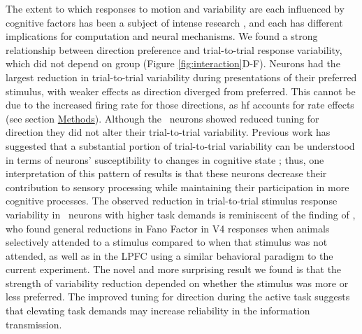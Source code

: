 The extent to which responses to motion and variability are each influenced by cognitive factors has been a subject of intense research \parencite{Renart2014,Gilbert2013}, and each has different implications for computation and neural mechanisms.   
We found a strong relationship between direction preference and trial-to-trial response variability, which did not depend on group (Figure \ref{fig:interaction}D-F). Neurons had the largest reduction in trial-to-trial variability during presentations of their preferred stimulus, with weaker effects as direction diverged from preferred. This cannot be due to the increased firing rate for those directions, as \gls{hf} accounts for rate effects (see section \hyperref[{sec:methods}]{Methods}). Although the \suppressed\ neurons showed reduced tuning for direction they did not alter their trial-to-trial variability. 
Previous work has suggested that a substantial portion of trial-to-trial variability can be understood in terms of neurons' susceptibility to changes in cognitive state \parencite{Ecker2016a,Denfield2018}; thus, one interpretation of this pattern of results is that these neurons decrease their contribution to sensory processing while maintaining their participation in more cognitive processes.
The observed reduction in trial-to-trial stimulus response variability in \enhanced\ neurons with higher task demands is reminiscent of the finding of \textcite{Mitchell2007}, who found general reductions in Fano Factor in V4 responses when animals selectively attended to a stimulus compared to when that stimulus was not attended, as well as \textcite{Hussar2010} in the LPFC using a similar behavioral paradigm to the current experiment.
The novel and more surprising result we found is that the strength of variability reduction depended on whether the stimulus was more or less preferred. The improved tuning for direction during the active task suggests that elevating task demands may increase reliability in the information transmission.

